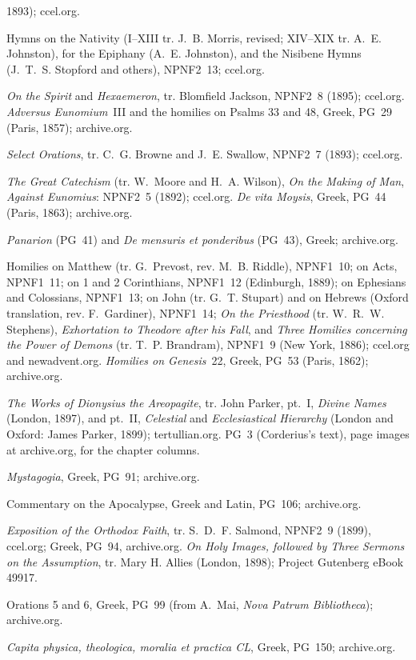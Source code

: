 \begin{description}
  1893); ccel.org.
\item[Ephrem the Syrian.] Hymns on the Nativity (I--XIII tr. J.~B. Morris, revised; XIV--XIX tr.
A.~E. Johnston), for the Epiphany (A.~E. Johnston), and the Nisibene
  Hymns (J.~T.~S. Stopford and others), NPNF2~13; ccel.org.
\item[Basil of Caesarea.] \emph{On the Spirit} and \emph{Hexaemeron}, tr.
  Blomfield Jackson, NPNF2~8 (1895); ccel.org. \emph{Adversus Eunomium}~III
  and the homilies on Psalms 33 and 48, Greek, PG~29 (Paris, 1857);
  archive.org.
\item[Gregory of Nazianzus.] \emph{Select Orations}, tr. C.~G. Browne and
  J.~E. Swallow, NPNF2~7 (1893); ccel.org.
\item[Gregory of Nyssa.] \emph{The Great Catechism} (tr. W.~Moore and
  H.~A. Wilson), \emph{On the Making of Man}, \emph{Against Eunomius}:
  NPNF2~5 (1892); ccel.org. \emph{De vita Moysis}, Greek, PG~44 (Paris,
  1863); archive.org.
\item[Epiphanius.] \emph{Panarion} (PG~41) and \emph{De mensuris et
  ponderibus} (PG~43), Greek; archive.org.
\item[John Chrysostom.] Homilies on Matthew (tr. G.~Prevost, rev.
  M.~B. Riddle), NPNF1~10; on Acts, NPNF1~11; on 1 and 2 Corinthians,
  NPNF1~12 (Edinburgh, 1889); on Ephesians and Colossians, NPNF1~13; on
  John (tr. G.~T. Stupart) and on Hebrews (Oxford translation, rev.
  F.~Gardiner), NPNF1~14; \emph{On the Priesthood} (tr. W.~R.~W. Stephens),
  \emph{Exhortation to Theodore after his Fall}, and \emph{Three Homilies
  concerning the Power of Demons} (tr. T.~P. Brandram), NPNF1~9 (New York,
  1886); ccel.org and newadvent.org. \emph{Homilies on Genesis}~22, Greek,
  PG~53 (Paris, 1862); archive.org.
\item[Dionysius the Areopagite.] \emph{The Works of Dionysius the
  Areopagite}, tr. John Parker, pt.~I, \emph{Divine Names} (London, 1897),
  and pt.~II, \emph{Celestial} and \emph{Ecclesiastical Hierarchy} (London
  and Oxford: James Parker, 1899); tertullian.org. PG~3 (Corderius's text),
  page images at archive.org, for the chapter columns.
\item[Maximus the Confessor.] \emph{Mystagogia}, Greek, PG~91;
  archive.org.
\item[Andrew of Caesarea.] Commentary on the Apocalypse, Greek and Latin,
  PG~106; archive.org.
\item[John Damascene.] \emph{Exposition of the Orthodox Faith}, tr.
  S.~D.~F. Salmond, NPNF2~9 (1899), ccel.org; Greek, PG~94, archive.org.
  \emph{On Holy Images, followed by Three Sermons on the Assumption}, tr.
  Mary H. Allies (London, 1898); Project Gutenberg eBook 49917.
\item[Theodore the Studite.] Orations 5 and 6, Greek, PG~99 (from
  A.~Mai, \emph{Nova Patrum Bibliotheca}); archive.org.
\item[Gregory Palamas.] \emph{Capita physica, theologica, moralia et
  practica CL}, Greek, PG~150; archive.org.
\end{description}

